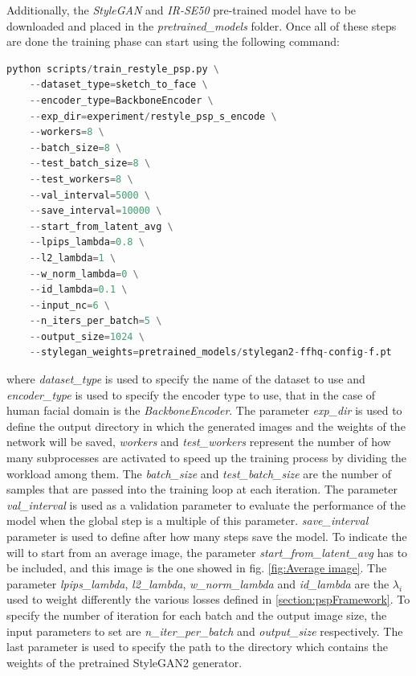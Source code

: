  Additionally, the \textit{StyleGAN} and \textit{IR-SE50} pre-trained model have to be downloaded and placed in the \textit{pretrained\_models} folder.
 Once all of these steps are done the training phase can start using the following command:
 \begin{lstlisting}[language=Python, numbers=none]
    python scripts/train_restyle_psp.py \
    --dataset_type=sketch_to_face \
    --encoder_type=BackboneEncoder \
    --exp_dir=experiment/restyle_psp_s_encode \
    --workers=8 \
    --batch_size=8 \
    --test_batch_size=8 \
    --test_workers=8 \
    --val_interval=5000 \
    --save_interval=10000 \
    --start_from_latent_avg \
    --lpips_lambda=0.8 \
    --l2_lambda=1 \
    --w_norm_lambda=0 \
    --id_lambda=0.1 \
    --input_nc=6 \
    --n_iters_per_batch=5 \
    --output_size=1024 \
    --stylegan_weights=pretrained_models/stylegan2-ffhq-config-f.pt
 \end{lstlisting}
where \textit{dataset\_type} is used to specify the name of the dataset to use and  \textit{encoder\_type} is used to specify the encoder type to use, that in the case of human facial domain is the \textit{BackboneEncoder}. The parameter \textit{exp\_dir} is used to define the output directory in which the generated images and the weights of the network will be saved, \textit{workers} and \textit{test\_workers} represent the number of how many subprocesses are activated to speed up the training process by dividing the workload among them. The \textit{batch\_size} and \textit{test\_batch\_size} are the number of samples that are passed into the training loop at each iteration. The parameter \textit{val\_interval} is used as a validation parameter to evaluate the performance of the model when the global step is a multiple of this parameter. \textit{save\_interval} parameter is used to define after how many steps save the model. To indicate the will to start from an average image, the parameter \textit{start\_from\_latent\_avg} has to be included, and this image is the one showed in fig. \ref{fig:Average image}. The parameter \textit{lpips\_lambda}, \textit{l2\_lambda}, \textit{w\_norm\_lambda} and \textit{id\_lambda} are the $\lambda_i$ used to weight differently the various losses defined in \ref{section:pspFramework}.
To specify the number of iteration for each batch and the output image size, the input parameters to set are \textit{n\_iter\_per\_batch} and \textit{output\_size} respectively. The last parameter is used to specify the path to the directory which contains the weights of the pretrained StyleGAN2 generator.\\
